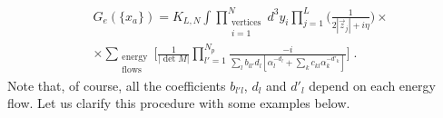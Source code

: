 \documentclass[%
 reprint,
 amsmath,amssymb,
 aps,
]{revtex4-1}
\begin{document}
  \begin{align}
&G_e(\{x_a\})\nonumber=K_{L,N}\int\prod_{\substack{\text{vertices}\\i=1}}^Nd^3y_i\prod_{j=1}^L\Big(\frac{1}{2|\vec{z}_j|+i\eta}\Big)\times\nonumber\\
&\times\sum_{\substack{\text{energy}\\\text{flows}}}\Big[\frac{1}{|\det{M}|}\prod_{l'=1}^{N_p}\frac{-i}{\sum_l b_{ll'}d_l[\alpha^{-d_l}_l+\sum_k c_{kl}\alpha_k^{-d'_k}]}\label{furgolinhh}\Big]\;.
\end{align}
Note that, of course, all the coefficients $b_{l'l}$, $d_l$ and $d'_l$ depend on each energy flow. Let us clarify this procedure with some examples below.



  





\end{document}
